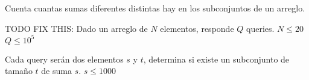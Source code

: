 \begin{exercise}
\end{exercise}

\begin{exercise}
\end{exercise}

\begin{exercise}
\end{exercise}

\begin{exercise}
\end{exercise}

\begin{exercise}
	Cuenta cuantas sumas diferentes distintas hay en los subconjuntos de un arreglo.
	
\end{exercise}

\begin{exercise}
\end{exercise}

\begin{exercise}
\end{exercise}

\begin{exercise}
	TODO FIX THIS:
	Dado un arreglo de \(N\) elementos, responde \(Q\) queries. \(N\leq 20\) \(Q \leq 10^5\)
	
	Cada query serán dos elementos \(s\) y \(t\), determina si existe un subconjunto de tamaño \(t\) de suma \(s\). \(s \leq 1000\)
	
\end{exercise}
